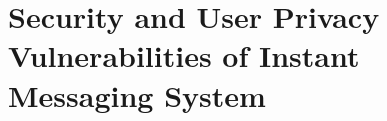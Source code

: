 \chapter{Security and User Privacy Vulnerabilities of Instant Messaging System}
\label{ch:security-and-user-privacy-vulnerabilities-of-instant-messaging-system}



%
%
%
%


